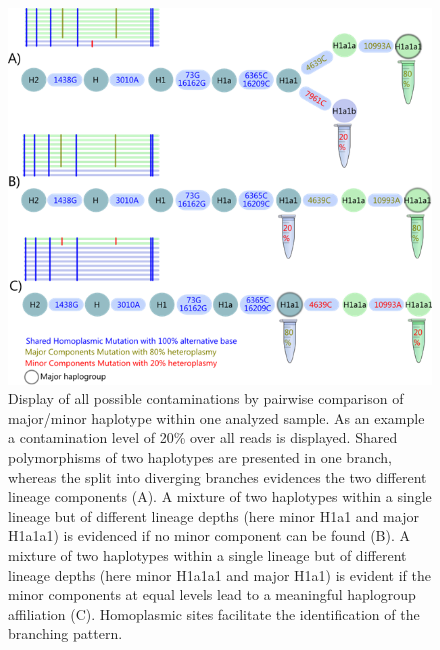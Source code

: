 \begin{figure}[!ht]
    \centering
    \includegraphics[width=1\textwidth]{images/heteroplasmy.png}
    \caption[Display of all possible pairwise sample contamination]{Display of all possible contaminations by pairwise comparison of major/minor haplotype within one analyzed sample. As an example a contamination level of 20\% over all reads is displayed. Shared polymorphisms of two haplotypes are presented in one branch, whereas the split into diverging branches evidences the two different lineage components (A). A mixture of two haplotypes within a single lineage but of different lineage depths (here minor H1a1 and major H1a1a1) is evidenced if no minor component can be found (B). A mixture of two haplotypes within a single lineage but of different lineage depths (here minor H1a1a1 and major H1a1) is evident if the minor components at equal levels lead to a meaningful haplogroup affiliation (C). Homoplasmic sites facilitate the identification of the branching pattern.} 
    \label{app:galaxy-boxplot}
\end{figure}